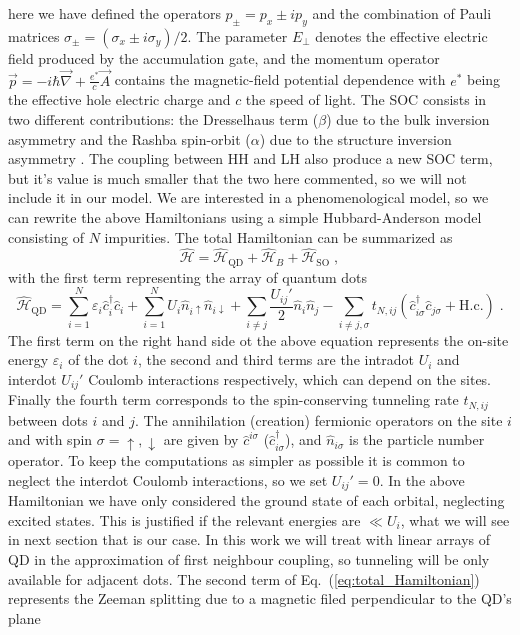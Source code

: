 here we have defined the operators $p_\pm=p_x\pm ip_y$ and the combination of Pauli matrices $\sigma_{\pm}=(\sigma_x\pm i\sigma_y)/2$. The parameter $E_\perp$ denotes the effective electric field produced by the accumulation gate, and the momentum operator $\vec{p}=-i\hbar\vec{\nabla}+\frac{e^*}{c}\vec{A}$ contains the magnetic-field potential dependence with $e^*$ being the effective hole electric charge and $c$ the speed of light. The SOC consists in two different contributions: the Dresselhaus term ($\beta$) due to the bulk inversion asymmetry \cite{Dresselhaus1955} and the Rashba spin-orbit ($\alpha$) due to the structure inversion asymmetry \cite{Bychkov1984}. The coupling between HH and LH also produce a new SOC term\cite{Bulaev2007}, but it's value is much smaller that the two here commented, so we will not include it in our model. We are interested in a phenomenological model, so we can rewrite the above Hamiltonians using a simple Hubbard-Anderson \cite{1963a,Anderson1961,Traa1994} model consisting of $N$ impurities. The total Hamiltonian can be summarized as
\begin{equation}
	\hat{\mathcal{H}}=\hat{\mathcal{H}}_{\text{QD}}+\hat{\mathcal{H}}_B+\hat{\mathcal{H}}_{\text{SO}}\; ,
	\label{eq:total_Hamiltonian}
\end{equation}
with the first term representing the array of quantum dots
\begin{equation}
	\hat{\mathcal{H}}_{\text{QD}}=\sum_{i=1}^N\varepsilon_{i}\hat{c}^\dagger_i\hat{c}_i+\sum_{i=1}^NU_i\hat{n}_{i\uparrow}\hat{n}_{i\downarrow}+\sum_{i\neq j}\frac{U_{ij}'}{2}\hat{n}_i\hat{n}_j-\sum_{i\neq j,\sigma}t_{N,ij}(\hat{c}^\dagger_{i\sigma}\hat{c}_{j\sigma}+ \text{H.c.})\; .
\end{equation}
The first term on the right hand side ot the above equation represents the on-site energy $\varepsilon_{i}$ of the dot $i$, the second and third terms are the intradot $U_i$ and interdot $U_{ij}'$ Coulomb interactions respectively, which can depend on the sites. Finally the fourth term corresponds to the spin-conserving tunneling rate $t_{N,ij}$ between dots $i$ and $j$. The annihilation (creation) fermionic operators on the site $i$ and with spin $\sigma=\uparrow,\downarrow$ are given by $\hat{c}^{i\sigma}$ ($\hat{c}_{i\sigma}^\dagger$), and $\hat{n}_{i\sigma}$ is the particle number operator. To keep the computations as simpler as possible it is common to neglect the interdot Coulomb interactions, so we set $U_{ij}'=0$. In the above Hamiltonian we have only considered the ground state of each orbital, neglecting excited states. This is justified if the relevant energies are $\ll U_i$, what we will see in next section that is our case. In this work we will treat with linear arrays of QD in the approximation of first neighbour coupling, so tunneling will be only available for adjacent dots. The second term of Eq.~(\ref{eq:total_Hamiltonian}) represents the Zeeman splitting due to a magnetic filed perpendicular to the QD's plane
